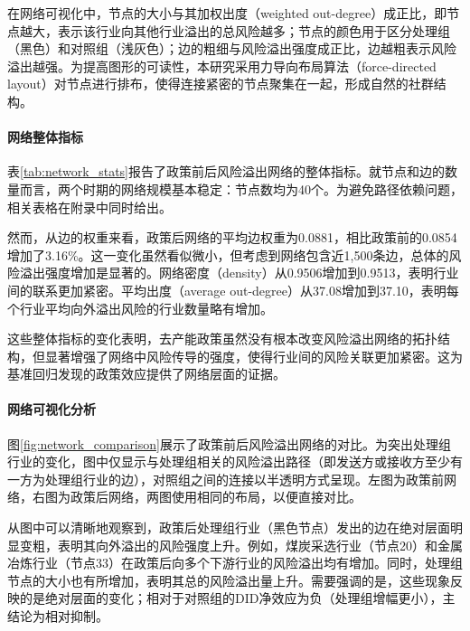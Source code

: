 在网络可视化中，节点的大小与其加权出度（weighted out-degree）成正比，即节点越大，表示该行业向其他行业溢出的总风险越多；节点的颜色用于区分处理组（黑色）和对照组（浅灰色）；边的粗细与风险溢出强度成正比，边越粗表示风险溢出越强。为提高图形的可读性，本研究采用力导向布局算法（force-directed layout）对节点进行排布，使得连接紧密的节点聚集在一起，形成自然的社群结构。

\paragraph{网络整体指标}

表\ref{tab:network_stats}报告了政策前后风险溢出网络的整体指标。就节点和边的数量而言，两个时期的网络规模基本稳定：节点数均为40个。为避免路径依赖问题，相关表格在附录中同时给出。



然而，从边的权重来看，政策后网络的平均边权重为0.0881，相比政策前的0.0854增加了3.16\%。这一变化虽然看似微小，但考虑到网络包含近1,500条边，总体的风险溢出强度增加是显著的。网络密度（density）从0.9506增加到0.9513，表明行业间的联系更加紧密。平均出度（average out-degree）从37.08增加到37.10，表明每个行业平均向外溢出风险的行业数量略有增加。

这些整体指标的变化表明，去产能政策虽然没有根本改变风险溢出网络的拓扑结构，但显著增强了网络中风险传导的强度，使得行业间的风险关联更加紧密。这为基准回归发现的政策效应提供了网络层面的证据。


\paragraph{网络可视化分析}

图\ref{fig:network_comparison}展示了政策前后风险溢出网络的对比。为突出处理组行业的变化，图中仅显示与处理组相关的风险溢出路径（即发送方或接收方至少有一方为处理组行业的边），对照组之间的连接以半透明方式呈现。左图为政策前网络，右图为政策后网络，两图使用相同的布局，以便直接对比。

从图中可以清晰地观察到，政策后处理组行业（黑色节点）发出的边在绝对层面明显变粗，表明其向外溢出的风险强度上升。例如，煤炭采选行业（节点20）和金属冶炼行业（节点33）在政策后向多个下游行业的风险溢出均有增加。同时，处理组节点的大小也有所增加，表明其总的风险溢出量上升。需要强调的是，这些现象反映的是绝对层面的变化；相对于对照组的DID净效应为负（处理组增幅更小），主结论为相对抑制。


